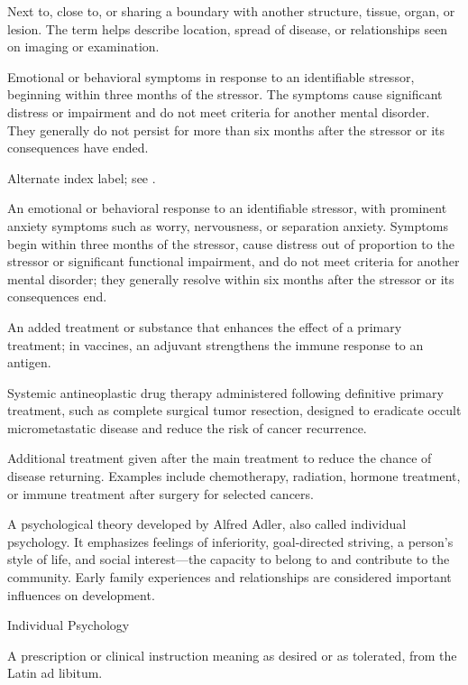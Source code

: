 Next to, close to, or sharing a boundary with another structure, tissue, organ, or lesion. The term helps describe location, spread of disease, or relationships seen on imaging or examination.

 Emotional or behavioral symptoms in response to an identifiable stressor, beginning within three months of the stressor. The symptoms cause significant distress or impairment and do not meet criteria for another mental disorder. They generally do not persist for more than six months after the stressor or its consequences have ended.

 Alternate index label; see .

 An emotional or behavioral response to an identifiable stressor, with prominent anxiety symptoms such as worry, nervousness, or separation anxiety. Symptoms begin within three months of the stressor, cause distress out of proportion to the stressor or significant functional impairment, and do not meet criteria for another mental disorder; they generally resolve within six months after the stressor or its consequences end.

 An added treatment or substance that enhances the effect of a primary treatment; in vaccines, an adjuvant strengthens the immune response to an antigen.

 Systemic antineoplastic drug therapy administered following definitive primary treatment, such as complete surgical tumor resection, designed to eradicate occult micrometastatic disease and reduce the risk of cancer recurrence.

 Additional treatment given after the main treatment to reduce the chance of disease returning. Examples include chemotherapy, radiation, hormone treatment, or immune treatment after surgery for selected cancers.

 A psychological theory developed by Alfred Adler, also called individual psychology. It emphasizes feelings of inferiority, goal-directed striving, a person’s style of life, and social interest—the capacity to belong to and contribute to the community. Early family experiences and relationships are considered important influences on development.

\synonyms
Individual Psychology

 A prescription or clinical instruction meaning as desired or as tolerated, from the Latin ad libitum.

